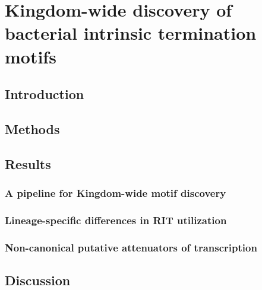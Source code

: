 
\chapter{Kingdom-wide discovery of bacterial intrinsic termination motifs}
\label{sec:chapterPingpong}
\ifpdf
    \graphicspath{{Chapter5/Chapter5Figs/EPS/}{Chapter5/Chapter5Figs/}}
\fi

\section{Introduction}

\section{Methods}

\section{Results}

\subsection{A pipeline for Kingdom-wide motif discovery}

\subsection{Lineage-specific differences in RIT utilization}

\subsection{Non-canonical putative attenuators of transcription}

\section{Discussion}